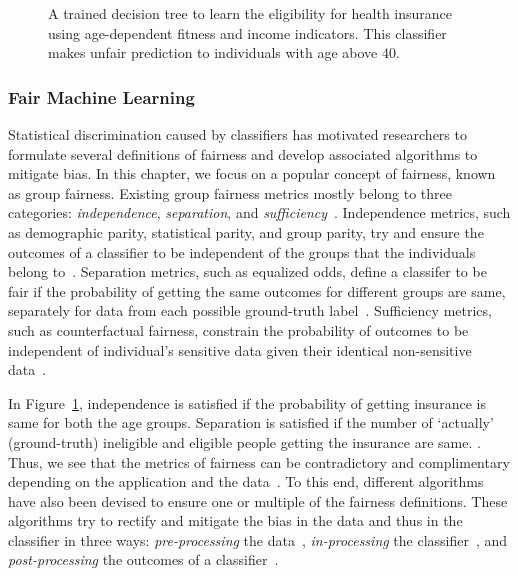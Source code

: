 \begin{figure}[!t]
{{
		}
	}
	\caption[A decision tree classifier on sensitive and non-sensitive features]{A trained decision tree to learn the eligibility for health insurance using age-dependent fitness and income indicators. This classifier makes unfair prediction to individuals with age above $ 40 $.}\label{fairness_justicia_fig:fair_example}%
\end{figure}


\subsubsection{Fair Machine Learning} Statistical discrimination caused by classifiers has motivated researchers to formulate several definitions of fairness and develop associated algorithms to mitigate bias. In this chapter, we focus on a popular concept of fairness, known as group fairness.  Existing group fairness metrics mostly belong to three categories: \textit{independence}, \textit{separation}, and \textit{sufficiency}~\cite{mehrabi2019survey}. Independence metrics, such as demographic parity, statistical parity, and group parity, try and ensure the outcomes of a classifier to be independent of the groups that the individuals belong to~\cite{feldman2015certifying,dwork2012fairness}. Separation metrics, such as equalized odds, define a classifer to be fair if the probability of getting the same outcomes for different groups are same, separately for data from each possible ground-truth label~\cite{hardt2016equality}. Sufficiency metrics, such as counterfactual fairness, constrain the probability of outcomes to be independent of individual's sensitive data given their identical non-sensitive data~\cite{kusner2017counterfactual}.

In Figure~\ref{fairness_justicia_fig:fair_example}, independence is satisfied if the probability of getting insurance is same for both the age groups. Separation is satisfied if the number of `actually' (ground-truth) ineligible and eligible people getting the insurance are same. . Thus, we see that the metrics of fairness can be contradictory and complimentary depending on the application and the data~\cite{corbett2018measure}. To this end, different algorithms have also been devised to ensure one or multiple of the fairness definitions. These algorithms try to rectify and mitigate the bias in the data and thus in the classifier in three ways: \textit{pre-processing} the data~\cite{kamiran2012data,zemel2013learning,calmon2017optimized}, \textit{in-processing} the classifier~\cite{zhang2018mitigating}, and \textit{post-processing} the outcomes of a classifier~\cite{kamiran2012decision,hardt2016equality}.

